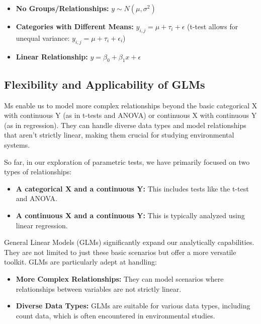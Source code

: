 \documentclass[
  letterpaper,
  DIV=11,
  numbers=noendperiod]{scrreprt}
\providecommand{\tightlist}{%
  \setlength{\itemsep}{0pt}\setlength{\parskip}{0pt}}
\begin{document}
\begin{itemize}
\tightlist
\item
  \textbf{No Groups/Relationships:} \(y \sim N(\mu, \sigma^2)\)
\item
  \textbf{Categories with Different Means:}
  \(y_{i,j} = \mu + \tau_i + \epsilon\) (t-test allows for unequal
  variance: \(y_{i,j} = \mu + \tau_i + \epsilon_i\))
\item
  \textbf{Linear Relationship:} \(y = \beta_0 + \beta_1x + \epsilon\)
\end{itemize}

\subsection{Flexibility and Applicability of
GLMs}\label{flexibility-and-applicability-of-glms}

Ms enable us to model more complex relationships beyond the basic
categorical X with continuous Y (as in t-tests and ANOVA) or continuous
X with continuous Y (as in regression). They can handle diverse data
types and model relationships that aren't strictly linear, making them
crucial for studying environmental systems.

So far, in our exploration of parametric tests, we have primarily
focused on two types of relationships:

\begin{itemize}
\tightlist
\item
  \textbf{A categorical X and a continuous Y:} This includes tests like
  the t-test and ANOVA.
\item
  \textbf{A continuous X and a continuous Y:} This is typically analyzed
  using linear regression.
\end{itemize}

General Linear Models (GLMs) significantly expand our analytically
capabilities. They are not limited to just these basic scenarios but
offer a more versatile toolkit. GLMs are particularly adept at handling:

\begin{itemize}
\tightlist
\item
  \textbf{More Complex Relationships:} They can model scenarios where
  relationships between variables are not strictly linear.
\item
  \textbf{Diverse Data Types:} GLMs are suitable for various data types,
  including count data, which is often encountered in environmental
  studies.
\end{itemize}
\end{document}
